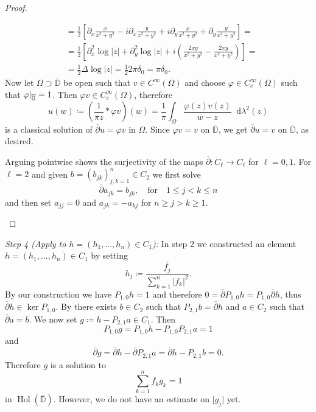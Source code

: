 \documentclass[letterpaper, 11pt]{article}
\newcommand{\D}{\mathbb{D}}
\newcommand{\1}{\mathds{1}}
\newcommand{\diff}{\mathop{}\!\mathrm{d}}
\newcommand{\cl}[1]{\overline{#1}}
\newcommand{\restr}[2]{{%
  \left.\kern-\nulldelimiterspace %
  #1 %
  \littletaller %
  \right|_{#2} %
  }}
\newcommand{\littletaller}{\mathchoice{\vphantom{\big|}}{}{}{}}
\newcommand{\wirtzbar}{\overline{\partial}}
\DeclareMathOperator*{\Hol}{Hol}
\theoremstyle{definition}
\newenvironment{innerproof}
 {\renewcommand{\qedsymbol}{}\proof}
 {\endproof}
\begin{document}
\begin{proof}{\ }
\begin{enumerate}
\begin{align*}
      &= \frac{1}{2} \left[ \partial_x \frac{x}{x^2 + y^2} - i \partial_x \frac{y}{x^2 + y^2} + i \partial_y \frac{x}{x^2 + y^2} + \partial_y \frac{y}{x^2 + y^2} \right] = \\
      &= \frac{1}{2} \left[ \partial^2_x \log \vert z \vert + \partial^2_y \log \vert z \vert + i \left( \frac{2xy}{x^2 + y^2} - \frac{2xy}{x^2 + y^2} \right) \right] = \\
      &= \frac{1}{2} \Delta \log \vert z \vert = \frac{1}{2} 2 \pi \delta_0 = \pi \delta_0.
    \end{align*}
    Now let $\Omega \supset \cl{\D}$ be open such that $v \in C^\infty(\Omega)$ and choose $\varphi \in C_c^\infty(\Omega)$ such that $\restr{\varphi}{\cl{\D}} = 1$. Then $\varphi v \in C_c^\infty(\Omega)$, therefore
    $$ u(w) \coloneqq \left(\frac{1}{\pi z} \ast \varphi v\right)(w) = \frac{1}{\pi} \int_\Omega \frac{\varphi(z) v(z)}{w - z} \diff \lambda^2(z) $$
    is a classical solution of $\wirtzbar u = \varphi v$ in $\Omega$. Since $\varphi v = v$ on $\cl{\D}$, we get $\wirtzbar u = v$ on $\cl\D$, as desired.

    Arguing pointwise shows the surjectivity of the maps $\wirtzbar : C_\ell \to C_\ell$ for $\ell = 0, 1$. For $\ell = 2$ and given $b = (b_{jk})_{j,k=1}^n \in C_2$ we first solve
    $$ \wirtzbar a_{jk} = b_{jk}, \quad \textrm{for} \quad 1 \leq j < k \leq n $$
    and then set $a_{jj} = 0$ and $a_{jk} = -a_{kj}$ for $n \geq j > k \geq 1$.
  \end{enumerate}
\end{proof}

\begin{innerproof}[Proof (continued)]
  \textit{Step 4 (Apply to $h = (h_1, \dots, h_n) \in C_1$):} In step 2 we constructed an element $h = (h_1, \dots, h_n) \in C_1$ by setting
  $$ h_j \coloneqq \frac{\bar{f_j}}{\sum_{k=1}^n \vert f_k \vert^2}. $$
  By our construction we have $P_{1,0} h = 1$ and therefore $0 = \wirtzbar P_{1,0} h = P_{1,0} \wirtzbar h$, thus $\wirtzbar h \in \ker P_{1,0}$. By  there exists $b \in C_2$ such that $P_{2,1} b = \wirtzbar h$ and $a \in C_2$ such that $\wirtzbar a = b$. We now set $g \coloneqq h - P_{2,1} a \in C_1$. Then
  $$ P_{1,0} g = P_{1,0} h - P_{1,0} P_{2,1} a = 1 $$
  and
  $$ \wirtzbar g = \wirtzbar h - \wirtzbar P_{2,1} a = \wirtzbar h - P_{2,1} b = 0. $$
  Therefore $g$ is a solution to
  $$ \sum_{k=1}^n f_k g_k = 1 $$
  in $\Hol(\cl{\D})$. However, we do not have an estimate on $\vert g_j \vert$ yet.
\end{innerproof}
\end{document}
